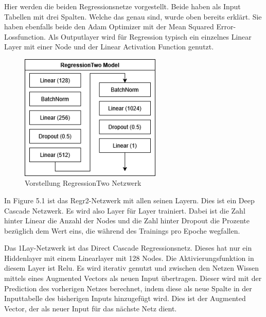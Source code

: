 Hier werden die beiden Regressionsnetze vorgestellt. Beide haben als Input Tabellen mit drei Spalten. 
Welche das genau sind, wurde oben bereits erklärt. Sie haben ebenfalls beide den Adam Optimizer mit der Mean Squared Error-Lossfunction. 
Als Outputlayer wird für Regression typisch ein einzelnes Linear Layer mit einer Node und der Linear Activation Function genutzt. 

\begin{figure}[htpb]
    \centering
    \includegraphics[height=6cm]{../../Graphiken/regressiontwo_2.png}
    \caption{\label{fig:regr2} Vorstellung RegressionTwo Netzwerk}
\end{figure}

In Figure 5.1 ist das Regr2-Netzwerk mit allen seinen Layern. Dies ist ein Deep Cascade Netzwerk. Es wird also Layer für Layer trainiert. 
Dabei ist die Zahl hinter Linear die Anzahl der Nodes und die Zahl hinter 
Dropout die Prozente bezüglich dem Wert eins, die während des Trainings pro Epoche wegfallen. 

Das 1Lay-Netzwerk ist das Direct Cascade Regressionsnetz. Dieses hat nur ein Hiddenlayer mit einem Linearlayer mit 128 Nodes. Die 
Aktivierungsfunktion in diesem Layer ist Relu. Es wird iterativ genutzt und zwischen den Netzen Wissen mittels eines Augmented Vectors als 
neuen Input übertragen. 
Dieser wird mit der Prediction des vorherigen Netzes berechnet, indem diese als neue Spalte in der Inputtabelle des bisherigen Inputs hinzugefügt 
wird. Dies ist der Augmented Vector, der als neuer Input für das nächste Netz dient. 
